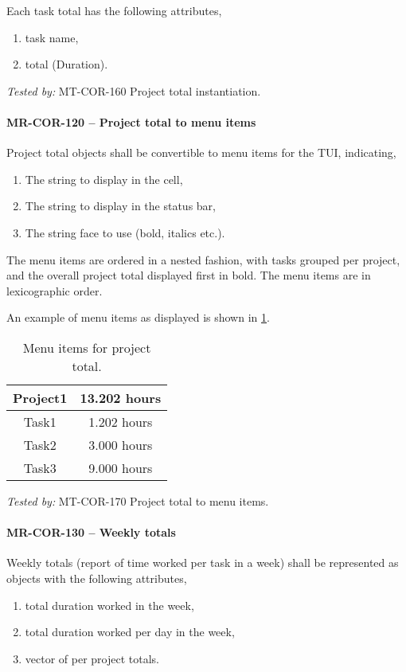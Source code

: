 Each task total has the following attributes,
\begin{enumerate}
\item task name,
\item total (Duration).
\end{enumerate}

\textit{Tested by: } MT-COR-160 Project total instantiation.

\paragraph{MR-COR-120 -- Project total to menu items}
Project total objects shall be convertible to menu items for the TUI,
indicating,
\begin{enumerate}
\item The string to display in the cell,
\item The string to display in the status bar,
\item The string face to use (bold, italics etc.).
\end{enumerate}

The menu items are ordered in a nested fashion, with tasks grouped per
project, and the overall project total displayed first in bold.
The menu items are in lexicographic order.

An example of menu items as displayed is shown in
\cref{tab:project_total_menu_items}.

\begin{table} \caption{\label{tab:project_total_menu_items} Menu items for
    project total.}
  \begin{tabular}{| c | c |} \hline
    \textbf{Project1} & \textbf{13.202 hours} \\ \hline
    Task1 & 1.202 hours \\ \hline
    Task2 & 3.000 hours \\ \hline
    Task3 & 9.000 hours \\ \hline
  \end{tabular}
\end{table}

\textit{Tested by: } MT-COR-170 Project total to menu items.

\paragraph{MR-COR-130 -- Weekly totals}
Weekly totals (report of time worked per task in a week) shall be represented
as objects with the following attributes,
\begin{enumerate}
\item total duration worked in the week,
\item total duration worked per day in the week,
\item vector of per project totals.
\end{enumerate}

